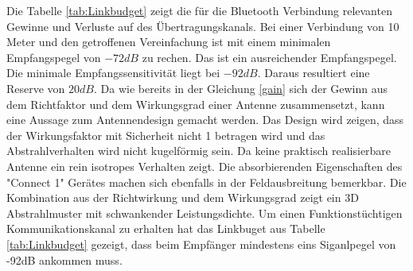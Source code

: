 Die Tabelle \ref{tab:Linkbudget} zeigt die für die Bluetooth Verbindung relevanten Gewinne und Verluste auf des Übertragungskanals. Bei einer Verbindung von 10 Meter und den getroffenen Vereinfachung ist mit einem minimalen Empfangspegel von $-72dB$ zu rechen. Das ist ein ausreichender Empfangspegel. Die minimale Empfangssensitivität liegt bei $-92dB$. Daraus resultiert eine Reserve von $20dB$. Da wie bereits in der Gleichung \ref{gain} sich der Gewinn aus dem Richtfaktor und dem Wirkungsgrad einer Antenne zusammensetzt, kann eine Aussage zum Antennendesign gemacht werden. Das Design wird zeigen, dass der Wirkungsfaktor mit Sicherheit nicht 1 betragen wird und das Abstrahlverhalten wird nicht kugelförmig sein. Da keine praktisch realisierbare Antenne ein rein isotropes Verhalten zeigt.  Die absorbierenden Eigenschaften des "Connect 1" Gerätes machen sich ebenfalls in der Feldausbreitung bemerkbar. Die Kombination aus der Richtwirkung und dem Wirkungsgrad zeigt ein  3D Abstrahlmuster mit schwankender Leistungsdichte. Um einen Funktionstüchtigen Kommunikationskanal zu erhalten hat das Linkbuget aus Tabelle \ref{tab:Linkbudget} gezeigt, dass beim Empfänger mindestens eins Siganlpegel von -92dB ankommen muss.


\newpage
